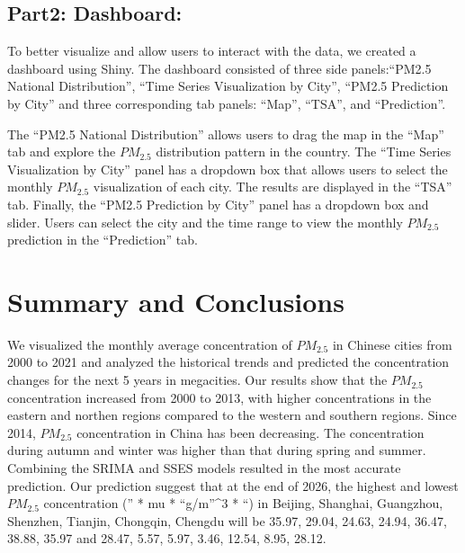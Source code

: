 \documentclass[
  12pt,
]{article}
\begin{document}
\newpage

\hypertarget{part2-dashboard}{%
\subsection{Part2: Dashboard:}\label{part2-dashboard}}

To better visualize and allow users to interact with the data, we
created a dashboard using Shiny. The dashboard consisted of three side
panels:``PM2.5 National Distribution'', ``Time Series Visualization by
City'', ``PM2.5 Prediction by City'' and three corresponding tab panels:
``Map'', ``TSA'', and ``Prediction''.

The ``PM2.5 National Distribution'' allows users to drag the map in the
``Map'' tab and explore the \(PM_{2.5}\) distribution pattern in the
country. The ``Time Series Visualization by City'' panel has a dropdown
box that allows users to select the monthly \(PM_{2.5}\) visualization
of each city. The results are displayed in the ``TSA'' tab. Finally, the
``PM2.5 Prediction by City'' panel has a dropdown box and slider. Users
can select the city and the time range to view the monthly \(PM_{2.5}\)
prediction in the ``Prediction'' tab.

\newpage

\hypertarget{summary-and-conclusions}{%
\section{Summary and Conclusions}\label{summary-and-conclusions}}

We visualized the monthly average concentration of \(PM_{2.5}\) in
Chinese cities from 2000 to 2021 and analyzed the historical trends and
predicted the concentration changes for the next 5 years in megacities.
Our results show that the \(PM_{2.5}\) concentration increased from 2000
to 2013, with higher concentrations in the eastern and northen regions
compared to the western and southern regions. Since 2014, \(PM_{2.5}\)
concentration in China has been decreasing. The concentration during
autumn and winter was higher than that during spring and summer.
Combining the SRIMA and SSES models resulted in the most accurate
prediction. Our prediction suggest that at the end of 2026, the highest
and lowest \(PM_{2.5}\) concentration ('' * mu * ``g/m''\^{}3 * ``) in
Beijing, Shanghai, Guangzhou, Shenzhen, Tianjin, Chongqin, Chengdu will
be 35.97, 29.04, 24.63, 24.94, 36.47, 38.88, 35.97 and 28.47, 5.57,
5.97, 3.46, 12.54, 8.95, 28.12.
\end{document}

